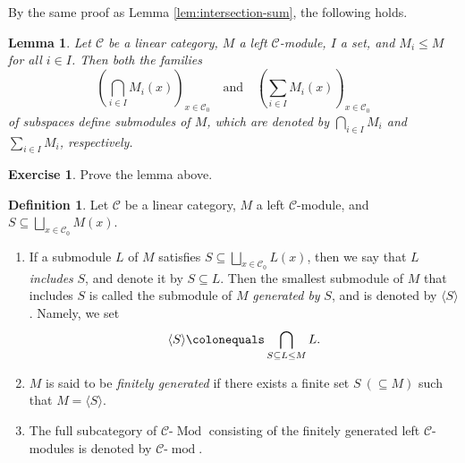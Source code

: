 \documentclass{surv-l}
\numberwithin{equation}{chapter}
\numberwithin{figure}{chapter}
\theoremstyle{plain}
\newtheorem{lem}[thm]{Lemma}
\theoremstyle{definition}
\newtheorem{dfn}[thm]{Definition}
\newtheorem{exc}[thm]{Exercise}
\theoremstyle{remark}
\newcommand{\lMod}{\text{-}\!\Mod}
\newcommand{\lmod}{\text{-}\!\operatorname{mod}}
\DeclareMathOperator{\Mod}{Mod}
\begin{document}
By the same proof as Lemma \ref{lem:intersection-sum},
the following holds.

\begin{lem}
Let ${\mathcal{C}}$ be a linear category, $M$ a left ${\mathcal{C}}$-module,
$I$ a set, and $M_i \le M$ for all $i \in I$.
Then both the families 
\[
(\bigcap_{i \in I} M_i(x))_{x \in {\mathcal{C}}_0} \quad \text{and} \quad (\sum_{i \in I} M_i(x))_{x \in {\mathcal{C}}_0}
\]
of subspaces
define submodules of $M$,
which are denoted by
$\bigcap_{i\in I} M_i$ and $\sum_{i\in I} M_i$, respectively.
\end{lem}

\begin{exc}
Prove the lemma above.
\end{exc}

\begin{dfn}
Let ${\mathcal{C}}$ be a linear category, $M$ a left ${\mathcal{C}}$-module, and
$S \subseteq \bigsqcup_{x\in {\mathcal{C}}_0} M(x)$.
\begin{enumerate}
\item
If a submodule $L$ of $M$ satisfies
$S \subseteq \bigsqcup_{x\in {\mathcal{C}}_0} L(x)$, then
we say that $L$ \emph{includes} $S$, and denote it by $S \subseteq L$.
Then the smallest submodule of $M$ that includes $S$ is called
the submodule of $M$ \emph{generated by} $S$, and is denoted by
${\langle S \rangle}$. Namely, we set
\[
{\langle S \rangle}\colonequals  \bigcap_{S \subseteq L \le M} L.
\]
\item
$M$ is said to be \emph{finitely generated} if there exists a finite set
$S\ (\subseteq M)$ such that $M = {\langle S \rangle}$.
\item
The full subcategory of ${\mathcal{C}}\lMod$ consisting of the finitely generated
left ${\mathcal{C}}$-modules is denoted by ${\mathcal{C}}\lmod$.
\end{enumerate}
\end{dfn}
\end{document}
